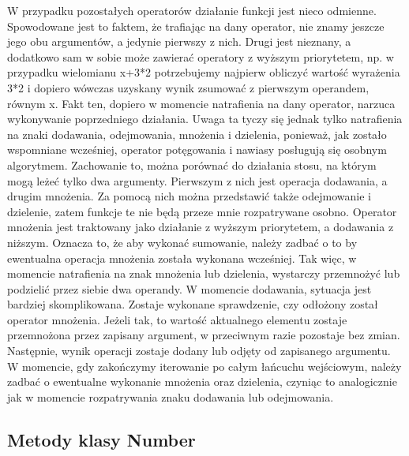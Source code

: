 \documentclass[twoside,a4paper]{book}
\begin{document}
W przypadku pozostałych operatorów działanie funkcji jest nieco odmienne. Spowodowane jest to faktem, że trafiając na dany operator, nie znamy jeszcze jego obu argumentów, a jedynie pierwszy z nich. Drugi jest nieznany, a dodatkowo sam w sobie może zawierać operatory z wyższym priorytetem, np. w przypadku wielomianu x+3*2 potrzebujemy najpierw obliczyć wartość wyrażenia 3*2 i dopiero wówczas uzyskany wynik zsumować z pierwszym operandem, równym x. Fakt ten, dopiero w momencie natrafienia na dany operator, narzuca wykonywanie poprzedniego działania. Uwaga ta tyczy się jednak tylko natrafienia na znaki dodawania, odejmowania, mnożenia i dzielenia, ponieważ, jak zostało wspomniane wcześniej, operator potęgowania i nawiasy posługują się osobnym algorytmem. Zachowanie to, można porównać do działania stosu, na którym mogą leżeć tylko dwa argumenty. Pierwszym z nich jest operacja dodawania, a drugim mnożenia. Za pomocą nich można przedstawić także odejmowanie i dzielenie, zatem funkcje te nie będą przeze mnie rozpatrywane osobno. Operator mnożenia jest traktowany jako działanie z wyższym priorytetem, a dodawania z niższym. Oznacza to, że aby wykonać sumowanie, należy zadbać o to by ewentualna operacja mnożenia została wykonana wcześniej. Tak więc, w momencie natrafienia na znak mnożenia lub dzielenia, wystarczy przemnożyć lub podzielić przez siebie dwa operandy. W momencie dodawania, sytuacja jest bardziej skomplikowana. Zostaje wykonane sprawdzenie, czy odłożony został operator mnożenia. Jeżeli tak, to wartość aktualnego elementu zostaje przemnożona przez zapisany argument, w przeciwnym razie pozostaje bez zmian. Następnie, wynik operacji zostaje dodany lub odjęty od zapisanego argumentu. W momencie, gdy zakończymy iterowanie po całym łańcuchu wejściowym, należy zadbać o ewentualne wykonanie mnożenia oraz dzielenia, czyniąc to analogicznie jak w momencie rozpatrywania znaku dodawania lub odejmowania.
\\

\subsection{Metody klasy Number}
\end{document}
